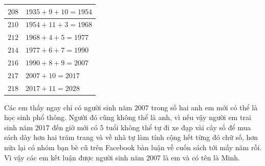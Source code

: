 \begin{multicols}{2}
\begin{table}[H]
\begin{tabular}{|l|l|}
			$208$&	$1935+9+10=1954$\\
			\hline
			$210$&	$1954+11+3=1968$\\
			\hline
			$212$&	$1968+4+5=1977$\\
			\hline
			$214$&	$1977+6+7=1990$\\
			\hline
			$216$&	$1990+8+9=2007$\\
			\hline
			$217$&	$2007+10=2017$\\
			\hline
			$218$&	$2017+11=2028$\\
			\hline
		\end{tabular}
		\vspace*{-5pt}
	\end{table}
	Các em thấy ngay chỉ có người sinh năm $2007$ trong số hai anh em mới có thể là học sinh phổ thông. Người đó cũng không thể là anh, vì nếu vậy người em trai sinh năm $2017$ đến giờ mới có $5$ tuổi không thể tự đi xe đạp vài cây số để mua sách dày hơn hai trăm trang và về nhà tự làm tính cộng hết từng đó chữ số, hơn nữa lại có nhóm bạn bè cũ trên Facebook bàn luận về cuốn sách tới mấy năm rồi. Vì vậy các em kết luận được người sinh năm $2007$ là em và có tên là Minh.
\end{multicols}
\newpage
\begingroup
\thispagestyle{toancuabinone}
